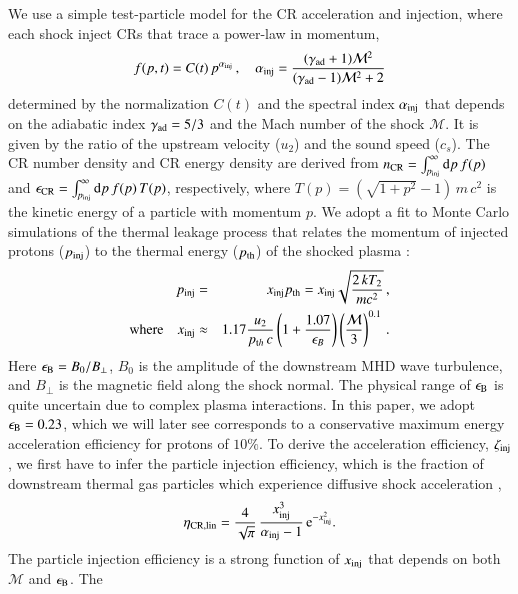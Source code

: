 \documentclass[fleqn,usenatbib,useAMS]{mnras}
\newcommand{\dd}{\mathrm{d}}
\newcommand\eb{\epsilon_\rmn{B}}
\begin{document}
We use a simple test-particle model for the CR acceleration and
injection, where each shock inject CRs that trace a power-law in
momentum,
\begin{equation}
  f(p,t) = C(t)\,p^{\alpha_{\mathrm{inj}}}\,,\quad
  \alpha_{\mathrm{inj}}=\frac{(\gamma_{\mathrm{ad}}+1)\mathcal{M}^2}
        {(\gamma_{\mathrm{ad}}-1)\mathcal{M}^2+2}
\end{equation}
determined by the normalization $C(t)$ and the spectral index
$\alpha_{{\mathrm{inj}}}$ that depends on the adiabatic index
$\gamma_{\mathrm{ad}} = 5/3$ and the Mach number of the shock
$\mathcal{M}$. It is given by the ratio of the upstream velocity
($u_2$) and the sound speed ($c_s$). The CR number density and CR
energy density are derived from $n_\rmn{CR} =
\int_{p_\rmn{inj}}^\infty \dd p\, f(p)$ and $\epsilon_\rmn{CR} =
\int_{p_\rmn{inj}}^\infty \dd p\, f(p) \,T(p)$, respectively, where
$T(p) = (\sqrt{1+p^2} -1)\, m\,c^2$ is the kinetic energy of a
particle with momentum $p$. We adopt a fit to Monte Carlo simulations
of the thermal leakage process that relates the momentum of injected
protons ($p_{\mathrm{inj}}$) to the thermal energy ($p_{\mathrm{th}}$) of the
shocked plasma \citep{kang11}:
\begin{eqnarray}
  \label{eq:qinj}
  p_{\mathrm{inj}} &=& x_{\mathrm{inj}} p_{\mathrm{th}} = x_{\mathrm{inj}} \sqrt{\frac{2 \,k T_2}{m c^2}}\,, \nonumber \\
  {\mathrm{where}}\quad x_{\mathrm{inj}} &\approx& 1.17 \frac{u_2}{p_{{\mathrm{t}}h}\,c} \left(1+
  \frac{1.07}{\epsilon_B}\right) \left(\frac{\mathcal{M}}{3}\right)^{0.1}\,.
\end{eqnarray}
Here $\eb = B_0/B_{\perp}$, $B_0$ is the amplitude of the downstream
MHD wave turbulence, and $B_{\perp}$ is the magnetic field along the
shock normal. The physical range of $\eb$ is quite uncertain due to
complex plasma interactions. In this paper, we adopt $\eb = 0.23$,
which we will later see corresponds to a conservative maximum energy
acceleration efficiency for protons of $10\%$. To derive the
acceleration efficiency, $\zeta_{\mathrm{inj}}$, we first have to infer the
particle injection efficiency, which is the fraction of downstream
thermal gas particles which experience diffusive shock acceleration
\citep[for details see ][]{pinzke13},
\begin{equation}
  \label{eq:eta}
  \eta_{\mathrm{CR,lin}} =
  \frac{4}{\sqrt{\pi}}\,\frac{x_{\mathrm{inj}}^3}{\alpha_{\mathrm{inj}}-1}\,
  {\mathrm{e}}^{-x_{\mathrm{inj}}^2}.
\end{equation}
The particle injection efficiency is a strong function of
$x_{\mathrm{inj}}$ that depends on both $\mathcal{M}$ and $\eb$. The
\end{document}
